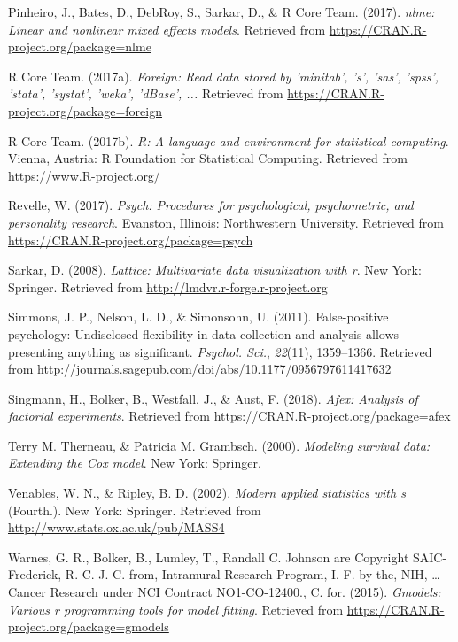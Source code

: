 \documentclass[english,man]{apa6}
\theoremstyle{definition}
\theoremstyle{definition}
\theoremstyle{definition}
\theoremstyle{remark}
\begin{document}
\hypertarget{ref-R-nlme}{}
Pinheiro, J., Bates, D., DebRoy, S., Sarkar, D., \& R Core Team. (2017).
\emph{nlme: Linear and nonlinear mixed effects models}. Retrieved from
\url{https://CRAN.R-project.org/package=nlme}

\hypertarget{ref-R-foreign}{}
R Core Team. (2017a). \emph{Foreign: Read data stored by 'minitab', 's',
'sas', 'spss', 'stata', 'systat', 'weka', 'dBase', ...} Retrieved from
\url{https://CRAN.R-project.org/package=foreign}

\hypertarget{ref-R-base}{}
R Core Team. (2017b). \emph{R: A language and environment for
statistical computing}. Vienna, Austria: R Foundation for Statistical
Computing. Retrieved from \url{https://www.R-project.org/}

\hypertarget{ref-R-psych}{}
Revelle, W. (2017). \emph{Psych: Procedures for psychological,
psychometric, and personality research}. Evanston, Illinois:
Northwestern University. Retrieved from
\url{https://CRAN.R-project.org/package=psych}

\hypertarget{ref-R-lattice}{}
Sarkar, D. (2008). \emph{Lattice: Multivariate data visualization with
r}. New York: Springer. Retrieved from
\url{http://lmdvr.r-forge.r-project.org}

\hypertarget{ref-Simmons2011-za}{}
Simmons, J. P., Nelson, L. D., \& Simonsohn, U. (2011). False-positive
psychology: Undisclosed flexibility in data collection and analysis
allows presenting anything as significant. \emph{Psychol. Sci.},
\emph{22}(11), 1359--1366. Retrieved from
\url{http://journals.sagepub.com/doi/abs/10.1177/0956797611417632}

\hypertarget{ref-R-afex}{}
Singmann, H., Bolker, B., Westfall, J., \& Aust, F. (2018). \emph{Afex:
Analysis of factorial experiments}. Retrieved from
\url{https://CRAN.R-project.org/package=afex}

\hypertarget{ref-R-survival-book}{}
Terry M. Therneau, \& Patricia M. Grambsch. (2000). \emph{Modeling
survival data: Extending the Cox model}. New York: Springer.

\hypertarget{ref-R-MASS}{}
Venables, W. N., \& Ripley, B. D. (2002). \emph{Modern applied
statistics with s} (Fourth.). New York: Springer. Retrieved from
\url{http://www.stats.ox.ac.uk/pub/MASS4}

\hypertarget{ref-R-gmodels}{}
Warnes, G. R., Bolker, B., Lumley, T., Randall C. Johnson are Copyright
SAIC-Frederick, R. C. J. C. from, Intramural Research Program, I. F. by
the, NIH, \ldots{} Cancer Research under NCI Contract NO1-CO-12400., C.
for. (2015). \emph{Gmodels: Various r programming tools for model
fitting}. Retrieved from
\url{https://CRAN.R-project.org/package=gmodels}
\end{document}
